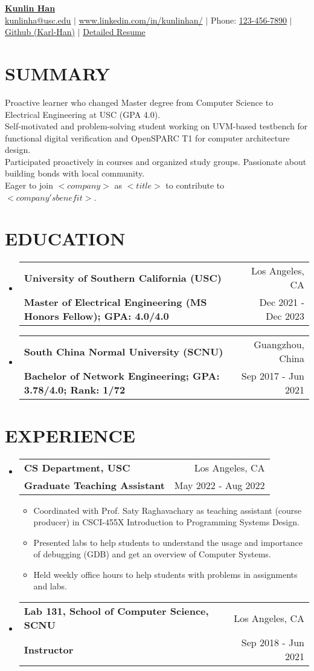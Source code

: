 \documentclass[letterpaper,11pt]{article}
\makeatletter
\newcommand{\resumeItemOne}[1]{
  \item\small{#1}
}
\newcommand{\resumeSubheading}[4]{
  \vspace{-1pt}\item
    \begin{tabular*}{0.97\textwidth}[t]{l@{\extracolsep{\fill}}r}
      \textbf{#1} & #2 \\
      \textbf{\small#3} & \small{#4} \\
    \end{tabular*}\vspace{-10pt}
}
\newcommand{\resumeSubHeadingListStart}{\begin{itemize}[leftmargin=*]}
\newcommand{\resumeSubHeadingListEnd}{\end{itemize}\vspace{-5pt}}
\newcommand{\resumeItemListStart}{\begin{itemize}}
\newcommand{\resumeItemListEnd}{\end{itemize}\vspace{-10pt}}
\makeatother
\begin{document}
\textbf{\href{https://www.linkedin.com/in/kunlinhan/}{\LARGE {Kunlin Han}}} \\
{
    \href{mailto:{kunlinha@usc.edu}}{{kunlinha@usc.edu}} $|$ \href{https://www.linkedin.com/in/kunlinhan/}{www.linkedin.com/in/kunlinhan/} $|$ Phone: \href{tel:{}}{123-456-7890} $|$ \href{https://github.com/Karl-Han}{Github (Karl-Han)}  $|$ \href{https://www.iwktd.com/}{Detailed Resume} 
}\section{SUMMARY}
Proactive learner who changed Master degree from Computer Science to Electrical Engineering at USC (GPA 4.0).\\ 
Self-motivated and problem-solving student working on UVM-based testbench for functional digital verification and OpenSPARC T1 for computer architecture design.\\ 
Participated proactively in courses and organized study groups. Passionate about building bonds with local community.\\ 
Eager to join $<company>$ as $<title>$ to contribute to $<company's benefit>$.\\ 


\section{EDUCATION}
\resumeSubHeadingListStart
\resumeSubheading
    {University of Southern California (USC)}{Los Angeles, CA}
    {Master of Electrical Engineering (MS Honors Fellow); GPA: 4.0/4.0
}{Dec 2021 - Dec 2023}
\resumeSubheading
    {South China Normal University (SCNU)}{Guangzhou, China}
    {Bachelor of Network Engineering; GPA: 3.78/4.0; Rank: 1/72
}{Sep 2017 - Jun 2021}
\resumeSubHeadingListEnd



\section{EXPERIENCE}
\resumeSubHeadingListStart
\resumeSubheading
    {CS Department, USC}{Los Angeles, CA}
    {Graduate Teaching Assistant}{May 2022 - Aug 2022}
\resumeItemListStart
	\resumeItemOne{Coordinated with Prof. Saty Raghavachary as teaching assistant (course producer) in CSCI-455X Introduction to Programming Systems Design.}
	\resumeItemOne{Presented labs to help students to understand the usage and importance of debugging (GDB) and get an overview of Computer Systems.}
	\resumeItemOne{Held weekly office hours to help students with problems in assignments and labs.}
\resumeItemListEnd
\resumeSubheading
    {Lab 131, School of Computer Science, SCNU}{Los Angeles, CA}
    {Instructor}{Sep 2018 - Jun 2021}
\resumeSubHeadingListEnd
\end{document}
